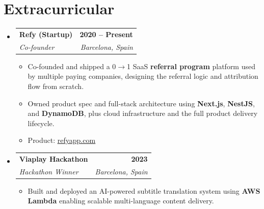 \documentclass[letterpaper,11pt]{article}
\makeatletter
\newcommand{\resumeItem}[1]{
  \item\small{{#1 \vspace{-2pt}}}
}
\newcommand{\resumeSubheading}[4]{
  \vspace{-2pt}\item
    \begin{tabular*}{1.0\textwidth}[t]{l@{\extracolsep{\fill}}r}
      \textbf{#1} & \textbf{\small #2} \\
      \textit{\small#3} & \textit{\small #4} \\
    \end{tabular*}\vspace{-7pt}
}
\newcommand{\resumeSubHeadingListStart}{\begin{itemize}[leftmargin=0.0in, label={}]}
\newcommand{\resumeSubHeadingListEnd}{\end{itemize}}
\newcommand{\resumeItemListStart}{\begin{itemize}}
\newcommand{\resumeItemListEnd}{\end{itemize}\vspace{-5pt}}
\makeatother
\begin{document}
\section{Extracurricular}
    \resumeSubHeadingListStart
        \resumeSubheading{Refy (Startup)}{2020 -- Present}{Co-founder}{Barcelona, Spain}
            \resumeItemListStart
                \resumeItem{Co-founded and shipped a 0$\rightarrow$1 SaaS \textbf{referral program} platform used by multiple paying companies, designing the referral logic and attribution flow from scratch.}
                \resumeItem{Owned product spec and full-stack architecture using \textbf{Next.js}, \textbf{NestJS}, and \textbf{DynamoDB}, plus cloud infrastructure and the full product delivery lifecycle.}
                \resumeItem{Product: \href{https://refyapp.com}{\underline{refyapp.com}}}
            \resumeItemListEnd

        \resumeSubheading{Viaplay Hackathon}{2023}{Hackathon Winner}{Barcelona, Spain}
            \resumeItemListStart
                \resumeItem{Built and deployed an AI-powered subtitle translation system using \textbf{AWS Lambda} enabling scalable multi-language content delivery.}
            \resumeItemListEnd

    \resumeSubHeadingListEnd
\end{document}
